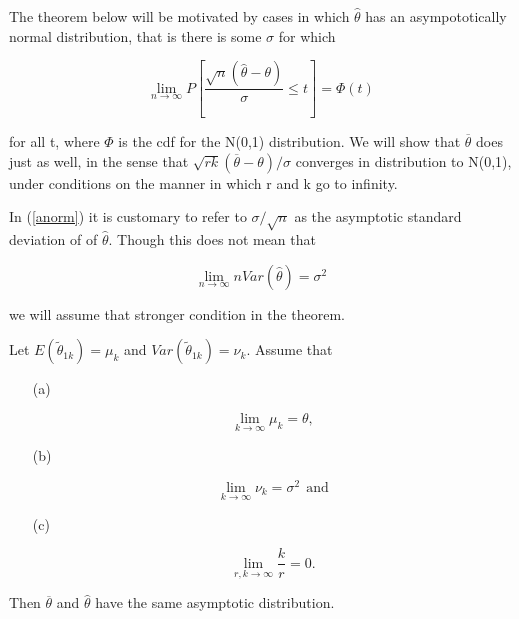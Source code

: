 The theorem below will be motivated by cases in which $\widehat{\theta}$
has an asympototically normal distribution, that is there is 
some $\sigma$ for which

\begin{equation}
\label{anorm}
\lim_{n \rightarrow \infty} P 
\left [
\frac
{\sqrt{n}(\widehat{\theta} - \theta)} {\sigma}
\leq t
\right ] = \Phi(t)
\end{equation}

\noindent for all t, where $\Phi$ is the cdf for the N(0,1)
distribution.  We will show that $\overline{\theta}$ does just as well,
in the sense that $\sqrt{rk}(\overline{\theta} - \theta)/\sigma$
converges in distribution to N(0,1), under conditions on the manner in
which r and k go to infinity.  

In (\ref{anorm}) it is customary to refer to $\sigma/\sqrt{n}$ as the
asymptotic standard deviation of of $\widehat{\theta}$.  Though this
does not mean that 

\begin{equation}
\label{avar}
\lim_{n \rightarrow \infty} n Var(\widehat{\theta}) = \sigma^2
\end{equation}

\noindent
we will assume that stronger condition in the theorem.

\begin{theorem} Let $E(\tilde{\theta}_{1k}) = \mu_k$ and
$Var(\tilde{\theta}_{1k}) = \nu_k$.  Assume that 

\begin{itemize}

\item [(a)]

\begin{equation}
\lim_{k \rightarrow \infty} \mu_k = \theta, 
\end{equation}

\item [(b)] 

\begin{equation}
\lim_{k \rightarrow \infty} \nu_k = \sigma^2 ~~ \textrm{and}
\end{equation}

\item [(c)]

\begin{equation}
\lim_{r,k \rightarrow \infty} \frac{k}{r} = 0. 
\end{equation}

\end{itemize}

\noindent
Then $\overline{\theta}$ and $\widehat{\theta}$ have the same asymptotic
distribution.

\end{theorem}

